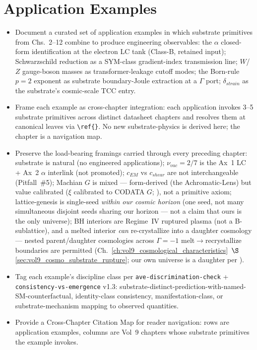 \chapter{Application Examples}
\label{ch:vol9_application_examples}

\begin{objectivebox}
\begin{itemize}
    \item Document a curated set of application examples in which substrate primitives from Chs.~2--12 combine to produce engineering observables: the $\alpha$ closed-form identification at the electron LC tank (Class-B, retained input); Schwarzschild reduction as a SYM-class gradient-index transmission line; $W$/$Z$ gauge-boson masses as transformer-leakage cutoff modes; the Born-rule $p=2$ exponent as substrate boundary-Joule extraction at a $\Gamma$ port; $\delta_{strain}$ as the substrate's cosmic-scale TCC entry.
    \item Frame each example as cross-chapter integration: each application invokes 3--5 substrate primitives across distinct datasheet chapters and resolves them at canonical leaves via \texttt{\textbackslash ref\{\}}. No new substrate-physics is derived here; the chapter is a navigation map.
    \item Preserve the load-bearing framings carried through every preceding chapter: substrate is natural (no engineered applications); $\nu_{vac} = 2/7$ is the Ax~1 LC + Ax~2 $\alpha$ interlink (not promoted); $c_{EM}$ vs $c_{shear}$ are not interchangeable (Pitfall~\#5); Machian $G$ is mixed --- form-derived (the Achromatic-Lens) but value calibrated ($\xi$ calibrated to CODATA $G$; ), not a primitive axiom; lattice-genesis is single-seed \emph{within our cosmic horizon} (one seed, not many simultaneous disjoint seeds sharing our horizon --- not a claim that ours is the only universe); BH interiors are Regime~IV ruptured plasma (not a B-sublattice), and a melted interior \emph{can} re-crystallize into a daughter cosmology --- nested parent/daughter cosmologies across $\Gamma=-1$\gammaundeclared{} melt$\to$recrystallize boundaries are permitted (Ch.~\ref{ch:vol9_cosmological_characteristics}~$\S$\ref{sec:vol9_cosmo_substrate_rupture}; our own universe is a daughter per ).
    \item Tag each example's discipline class per \texttt{ave-discrimination-check} + \texttt{consistency-vs-emergence} v1.3: substrate-distinct-prediction-with-named-SM-counterfactual, identity-class consistency, manifestation-class, or substrate-mechanism mapping to observed quantities.
    \item Provide a Cross-Chapter Citation Map for reader navigation: rows are application examples, columns are Vol~9 chapters whose substrate primitives the example invokes.
\end{itemize}
\end{objectivebox}

